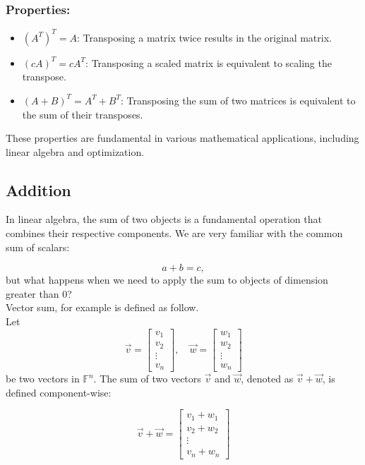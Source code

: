 \subsubsection{Properties:}

\begin{itemize}
    \item $(A^T)^T = A$: Transposing a matrix twice results in the original matrix.
    \item $(cA)^T = cA^T$: Transposing a scaled matrix is equivalent to scaling the transpose.
    \item $(A + B)^T = A^T + B^T$: Transposing the sum of two matrices is equivalent to the sum of their transposes.
\end{itemize}

These properties are fundamental in various mathematical applications, including linear algebra and optimization.


\subsection{Addition}
In linear algebra, the sum of two objects is a fundamental operation that combines their respective components.
We are very familiar with the common sum of scalars:

$$
a + b = c,
$$
but what happens when we need to apply the sum to objects of dimension greater than 0?
\\

Vector sum, for example is defined as follow. 
\\

Let 
$$
\vec{v} = \begin{bmatrix} v_1 \\ v_2 \\ \vdots \\ v_n \end{bmatrix}, \quad \vec{w} = \begin{bmatrix} w_1 \\ w_2 \\ \vdots \\ w_n \end{bmatrix}
$$
be two vectors in \(\mathbb{F}^n\). 
    The sum of two vectors \(\vec{v}\) and \(\vec{w}\), denoted as \(\vec{v} + \vec{w}\), is defined component-wise:
    
\[ \vec{v} + \vec{w} = \begin{bmatrix} v_1 + w_1 \\ v_2 + w_2 \\ \vdots \\ v_n + w_n \end{bmatrix} \]


